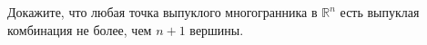 Докажите, что любая точка выпуклого многогранника в $\mathbb{R}^n$ есть выпуклая комбинация не более, чем
$n + 1$ вершины.
